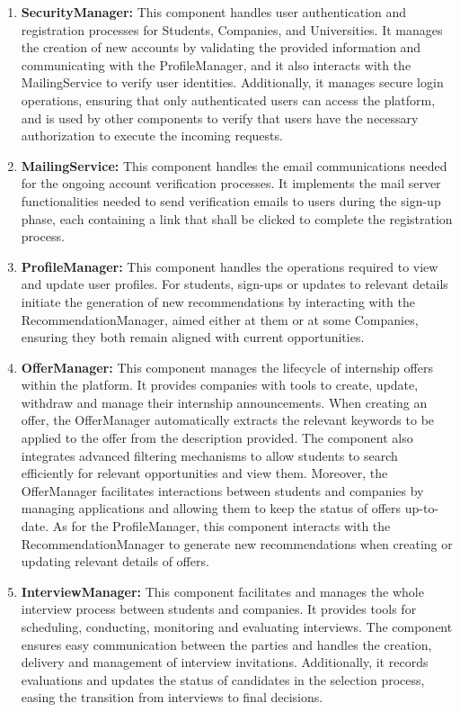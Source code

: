 \begin{enumerate}
    \item \textbf{SecurityManager:} This component handles user authentication and registration processes for Students, Companies, and Universities. It manages the creation of new accounts by validating the provided information and communicating with the ProfileManager, and it also interacts with the MailingService to verify user identities. Additionally, it manages secure login operations, ensuring that only authenticated users can access the platform, and is used by other components to verify that users have the necessary authorization to execute the incoming requests.
    \item \textbf{MailingService:} This component handles the email communications needed for the ongoing account verification processes. It implements the mail server functionalities needed to send verification emails to users during the sign-up phase, each containing a link that shall be clicked to complete the registration process.
    \item \textbf{ProfileManager:} This component handles the operations required to view and update user profiles. For students, sign-ups or updates to relevant details initiate the generation of new recommendations by interacting with the RecommendationManager, aimed either at them or at some Companies, ensuring they both remain aligned with current opportunities.
    \item \textbf{OfferManager:} This component manages the lifecycle of internship offers within the platform. It provides companies with tools to create, update, withdraw and manage their internship announcements. When creating an offer, the OfferManager automatically extracts the relevant keywords to be applied to the offer from the description provided. The component also integrates advanced filtering mechanisms to allow students to search efficiently for relevant opportunities and view them. Moreover, the OfferManager facilitates interactions between students and companies by managing applications and allowing them to keep the status of offers up-to-date. As for the ProfileManager, this component interacts with the RecommendationManager to generate new recommendations when creating or updating relevant details of offers.
    \item \textbf{InterviewManager:} This component facilitates and manages the whole interview process between students and companies. It provides tools for scheduling, conducting, monitoring and evaluating interviews. The component ensures easy communication between the parties and handles the creation, delivery and management of interview invitations. Additionally, it records evaluations and updates the status of candidates in the selection process, easing the transition from interviews to final decisions.

\end{enumerate}
